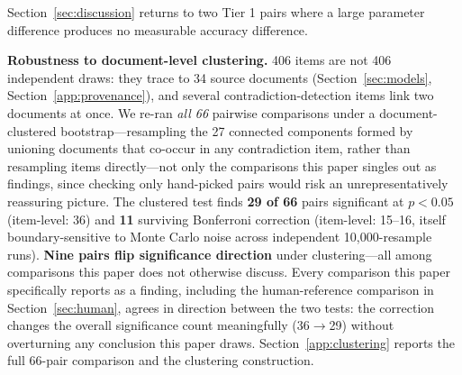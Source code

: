 Section~\ref{sec:discussion} returns to two Tier 1 pairs where a large parameter difference produces
no measurable accuracy difference.

\textbf{Robustness to document-level clustering.} 406 items are not 406 independent draws: they trace
to 34 source documents (Section~\ref{sec:models}, Section~\ref{app:provenance}), and several
contradiction-detection items link two documents at once. We re-ran \emph{all 66} pairwise
comparisons under a document-clustered bootstrap---resampling the 27 connected components formed by
unioning documents that co-occur in any contradiction item, rather than resampling items
directly---not only the comparisons this paper singles out as findings, since checking only
hand-picked pairs would risk an unrepresentatively reassuring picture. The clustered test finds
\textbf{29 of 66} pairs significant at $p<0.05$ (item-level: 36) and \textbf{11} surviving Bonferroni
correction (item-level: 15--16, itself boundary-sensitive to Monte Carlo noise across independent
10,000-resample runs). \textbf{Nine pairs flip significance direction} under clustering---all among
comparisons this paper does not otherwise discuss. Every comparison this paper specifically reports
as a finding, including the human-reference comparison in Section~\ref{sec:human}, agrees in
direction between the two tests: the correction changes the overall significance count meaningfully
(36$\to$29) without overturning any conclusion this paper draws. Section~\ref{app:clustering}
reports the full 66-pair comparison and the clustering construction.
